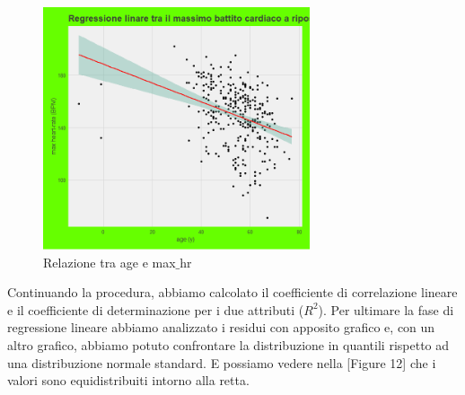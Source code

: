 \documentclass{article}
\begin{document}
\begin{figure}[h]
	\centering
	\includegraphics[width=0.7\textwidth]{age e maxhr.png}
	\caption{Relazione tra age e max$\_$hr}
	\label {fig:ds1}
\end{figure}
\newpage
Continuando la procedura, abbiamo calcolato il coefficiente di correlazione lineare e il coefficiente di determinazione per i due attributi ($R^2$). Per ultimare la fase di regressione lineare abbiamo analizzato i residui con apposito grafico e, con un altro grafico, abbiamo potuto confrontare la distribuzione in quantili rispetto ad una distribuzione normale standard. E possiamo vedere nella [Figure 12] che i valori sono equidistribuiti intorno alla retta.
 
\end{document}
